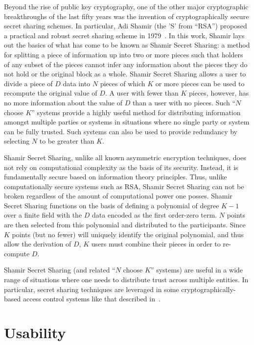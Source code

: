 Beyond the rise of public key cryptography, one of the other major
cryptographic breakthroughs of the last fifty years was the invention
of cryptographically secure secret sharing schemes. In particular, Adi
Shamir (the 'S' from ``RSA'') proposed a practical and robust secret
sharing scheme in 1979~\cite{shamir1979}. In this work, Shamir lays
out the basics of what has come to be known as Shamir Secret Sharing:
a method for splitting a piece of information up into two or more
pieces such that holders of any subset of the pieces cannot infer any
information about the pieces they do not hold or the original block as
a whole. Shamir Secret Sharing allows a user to divide a piece of $D$
data into $N$ pieces of which $K$ or more pieces can be used to
recompute the original value of $D$. A user with fewer than $K$
pieces, however, has no more information about the value of $D$ than a
user with no pieces. Such ``$N$ choose $K$'' systems provide a highly
useful method for distributing information amongst multiple parties or
systems in situations where no single party or system can be fully
trusted. Such systems can also be used to provide redundancy by
selecting $N$ to be greater than $K$.

Shamir Secret Sharing, unlike all known asymmetric encryption
techniques, does not rely on computational complexity as the basis of
its security. Instead, it is fundamentally secure based on information
theory principles. Thus, unlike computationally secure systems such as
RSA, Shamir Secret Sharing can not be broken regardless of the amount
of computational power one posses. Shamir Secret Sharing functions on
the basis of defining a polynomial of degree $K-1$ over a finite field
with the $D$ data encoded as the first order-zero term. $N$ points are
then selected from this polynomial and distributed to the
participants. Since $K$ points (but no fewer) will uniquely identify the
original polynomial, and thus allow the derivation of $D$, $K$ users must
combine their pieces in order to re-compute $D$.

Shamir Secret Sharing (and related ``$N$ choose $K$'' systems) are
useful in a wide range of situations where one needs to distribute
trust across multiple entities. In particular, secret sharing
techniques are leveraged in some cryptographically-based access
control systems like that described in~\cite{goyal2006}.

\section{Usability}
\label{chap:background:usability}

